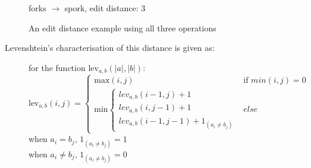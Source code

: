 \documentclass[a4paper,11pt,twoside,notitlepage]{article}
\newcommand\CellText[2]{%
          \node[texto,left=of mat#1,anchor=east]
          at (mat#1.west)
          {\large #2};
        }
\newcommand\SlText[2]{%
          \node[texto,left=of mat#1,anchor=west,rotate=50]
          at ([xshift=1.5ex,yshift=1ex]mat#1.north)
          {\large #2};
        }
\begin{document}
        \begin{figure}[h]
          \centering
                  

          \vspace{3 mm}

          forks $\rightarrow$ spork, edit distance: 3
          
          \caption{An edit distance example using all three
            operations}
          \label{fig:fork-spork}
        \end{figure}

        Levenshtein's characterisation of this distance is given as:
        
        \begin{figure}[H]
          \centering
          for the function $\mbox{lev}_{a,b}(|a|,|b|)$:\\
          $$\mbox{lev}_{a,b}(i,j) = 
             \left\{
                \begin{array}{ll}
                  \mbox{max}(i,j) & \mbox{if }min(i,j) = 0\\
                  \mbox{min}\left\{
                        \begin{array}{lll}
                          lev_{a,b}(i-1,j)+1\\
                          lev_{a,b}(i,j-1)+1\\
                          lev_{a,b}(i-1,j-1)+1_{(a_i{\neq}b_j)}
                        \end{array}
                      \right.
	                & else 
	        \end{array}
             \right.$$
             when $a_i = b_j$, $1_{(a_i{\neq}b_j)} = 1$\\
             when  $a_i \neq b_j$, $1_{(a_i{\neq}b_j)} = 0$
        \end{figure}
\end{document}
